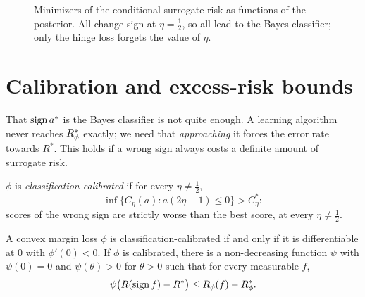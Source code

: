 \begin{notechapter}
\begin{figure}[ht]
\centering
{}
\caption{Minimizers of the conditional surrogate risk as functions of the
posterior. All change sign at $\eta = \frac12$, so all lead to the Bayes classifier; only
the hinge loss forgets the value of $\eta$.}
\label{surrogate-losses:fig:minimizers}
\end{figure}

\section{Calibration and excess-risk bounds}\label{surrogate-losses:sec:calibration}

That $\operatorname{sign} a^*$ is the Bayes classifier is not quite enough. A learning algorithm
never reaches $R^*_\phi$ exactly; we need that \emph{approaching} it forces the error
rate towards $R^*$. This holds if a wrong sign always costs a definite amount of
surrogate risk.

\begin{definition}
$\phi$ is \emph{classification-calibrated} if for every $\eta\neq\frac12$,
\[
  \inf\bigl\{C_\eta(a) : a(2\eta - 1)\leq0\bigr\}>C^*_\eta :
\]
scores of the wrong sign are strictly worse than the best score, at every $\eta\neq\frac12$.
\end{definition}

\begin{theorem}\label{surrogate-losses:thm:bjm}
A convex margin loss $\phi$ is classification-calibrated if and only if it is
differentiable at $0$ with $\phi'(0)<0$. If $\phi$ is calibrated, there is a non-decreasing
function $\psi$ with $\psi(0) = 0$ and $\psi(\theta)>0$ for $\theta>0$ such that for every measurable $f$,
\[
  \psi\bigl(R(\operatorname{sign} f) - R^*\bigr)\leq R_\phi(f) - R^*_\phi .
\]
\end{theorem}


\end{notechapter}
